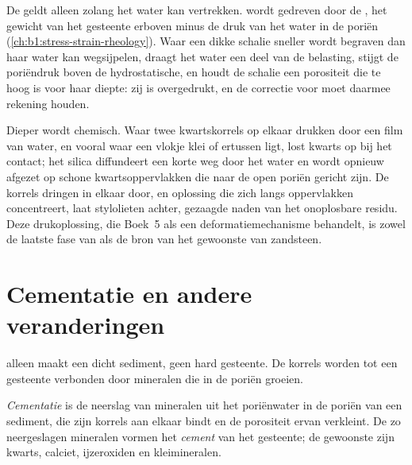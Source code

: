 De  geldt alleen zolang het water kan vertrekken.  wordt gedreven door de , het gewicht van het gesteente erboven minus de druk van het water in de poriën (\cref{ch:b1:stress-strain-rheology}). Waar een dikke schalie sneller wordt begraven dan haar water kan wegsijpelen, draagt het water een deel van de belasting, stijgt de poriëndruk boven de hydrostatische, en houdt de schalie een porositeit die te hoog is voor haar diepte: zij is overgedrukt, en de correctie voor  moet daarmee rekening houden.

Dieper wordt  chemisch. Waar twee kwartskorrels op elkaar drukken door een film van water, en vooral waar een vlokje klei of  ertussen ligt, lost kwarts op bij het contact; het silica diffundeert een korte weg door het water en wordt opnieuw afgezet op schone kwartsoppervlakken die naar de open poriën gericht zijn. De korrels dringen in elkaar door, en oplossing die zich langs oppervlakken concentreert, laat stylolieten achter, gezaagde naden van het onoplosbare residu. Deze drukoplossing, die Boek~5 als een deformatiemechanisme behandelt, is zowel de laatste fase van  als de bron van het gewoonste  van zandsteen.

\section{Cementatie en andere veranderingen}\label{sec:b1:diagenesis-basins:cementation}

 alleen maakt een dicht sediment, geen hard gesteente. De korrels worden tot een gesteente verbonden door mineralen die in de poriën groeien.

\begin{definition}\label{def:b1:diagenesis-basins:cement}
\emph{Cementatie} is de neerslag van mineralen uit het poriënwater in de poriën van een sediment, die zijn korrels aan elkaar bindt en de porositeit ervan verkleint. De zo neergeslagen mineralen vormen het \emph{cement} van het gesteente; de gewoonste zijn kwarts, calciet, ijzeroxiden en kleimineralen.
\end{definition}


